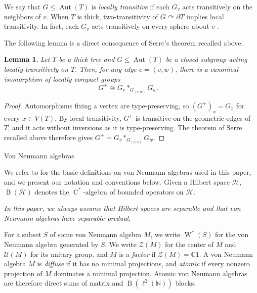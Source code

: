 \documentclass[11pt]{amsart}
\makeatletter
\numberwithin{equation}{section}
\def\subsection{\@startsection{subsection}{2}%
  \z@{.7\linespacing\@plus.7\linespacing}{.3\linespacing}%
  {\normalfont\bfseries}}
\newcommand{\nn}{\mathbb N}
\newcommand{\cc}{\mathbb C}
\renewcommand{\H}{\mathcal H}
\newcommand{\U}{\mathcal U}
\newcommand{\Z}{\mathcal Z}
\DeclareMathOperator{\Aut}{Aut}
\newcommand{\Wstar}{\operatorname{W}^*}
\newcommand{\Cstar}{\operatorname{C}^*}
\newcommand{\actson}{\curvearrowright}
\newcommand{\rB}{\operatorname{B}}
\newtheorem{Lem}[The]{Lemma}
\theoremstyle{definition}
\makeatother
\begin{document}
We say that $G\leq \Aut(T)$ is \emph{locally transitive} if each $G_v$ acts transitively on the neighbors of $v$. When $T$ is thick, two-transitivity of $G\actson \partial T$ implies local transitivity. In fact, each $G_v$ acts transitively on every sphere about $v$ \cite[Lemma~3.1.1]{BM00}.

The following lemma is a direct consequence of Serre's theorem recalled above.

\begin{Lem}
    \label{lem:tree-amalgam}
    Let $T$ be a thick tree and $G\leq\Aut(T)$ be a closed subgroup acting locally transitively on $T$. Then, for any edge $e=(v,w)$, there is a canonical isomorphism of locally compact groups
    $$G^+\cong G_{v}\ast_{G_{(v,w)}}G_{w}.$$ 
\end{Lem}

\begin{proof}
    Automorphisms fixing a vertex are type-preserving, so $(G^+)_x=G_x$ for every $x\in V(T)$. By local transitivity, $G^+$ is transitive on the geometric edges of $T$, and it acts without inversions as it is type-preserving. The theorem of Serre recalled above \cite[Chapter~I, Section~4.1, Theorem~6]{Serre80} therefore gives $G^+=G_v\ast_{G_{(v,w)}}G_w$.
\end{proof}


\subsection{Von Neumann algebras}
\label{subsec:prelim-vna}

We refer to \cite{HR19} for the basic definitions on von Neumann algebras used in this paper, and we present our notation and conventions below. Given a Hilbert space $\H$, $\rB(\H)$ denotes the $\Cstar$-algebra of bounded operators on $\H$. 

\begin{center}
    \vspace{\medskipamount}
    \emph{In this paper, we always assume that Hilbert spaces are separable and that von Neumann algebras have separable predual.}
    \vspace{\medskipamount}
\end{center}

For a subset $S$ of some von Neumann algebra $M$, we write $\Wstar(S)$ for the von Neumann algebra generated by $S$. We write $\Z(M)$ for the center of $M$ and $\U(M)$ for its unitary group, and $M$ is a \emph{factor} if $\Z(M)=\cc1$. 
A von Neumann algebra $M$ is \emph{diffuse} if it has no minimal projections, and \emph{atomic} if every nonzero projection of $M$ dominates a minimal projection. Atomic von Neumann algebras are therefore direct sums of matrix and $\rB(\ell^2(\nn))$ blocks. 
\end{document}
